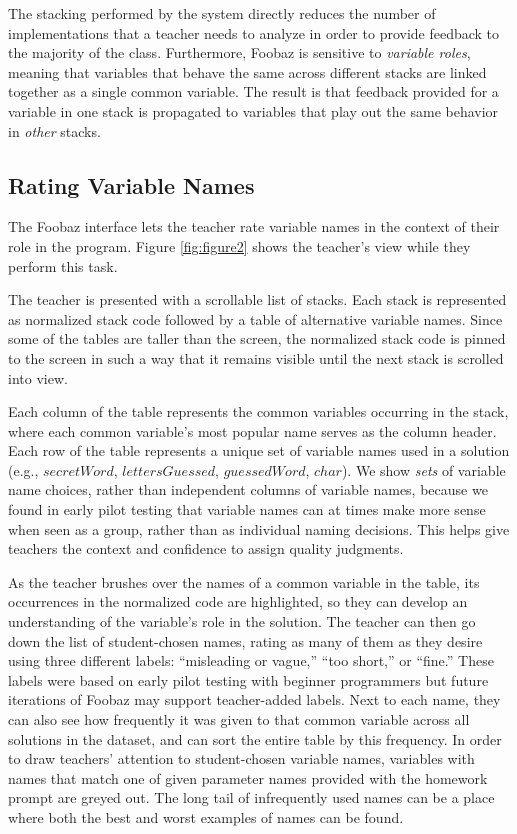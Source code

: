 The stacking performed by the system directly reduces the number of implementations that a teacher needs to analyze in order to provide feedback to the majority of the class. Furthermore, Foobaz is sensitive to \emph{variable roles}, meaning that variables that behave the same across different stacks are linked together as a single common variable. The result is that feedback provided for a variable in one stack is propagated to variables that play out the same behavior in \emph{other} stacks.

\subsection{Rating Variable Names}

The Foobaz interface lets the teacher rate variable names in the context of their role in the program. Figure \ref{fig:figure2} shows the teacher's view while they perform this task. 

The teacher is presented with a scrollable list of stacks. Each stack is represented as normalized stack code followed by a table of alternative variable names. Since some of the tables are taller than the screen, the normalized stack code is pinned to the screen in such a way that it remains visible until the next stack is scrolled into view.

Each column of the table represents the common variables occurring in the stack, where each common variable's most popular name serves as the column header. Each row of the table represents a unique set of variable names used in a solution (e.g., $secretWord$, $lettersGuessed$, $guessedWord$, $char$). We show \emph{sets} of variable name choices, rather than independent columns of variable names, because we found in early pilot testing that variable names can at times make more sense when seen as a group, rather than as individual naming decisions. This helps give teachers the context and confidence to assign quality judgments.

As the teacher brushes over the names of a common variable in the table, its occurrences in the normalized code are highlighted, so they can develop an understanding of the variable's role in the solution. The teacher can then go down the list of student-chosen names, rating as many of them as they desire using three different labels: ``misleading or vague,'' ``too short,'' or ``fine.'' These labels were based on early pilot testing with beginner programmers but future iterations of Foobaz may support teacher-added labels. Next to each name, they can also see how frequently it was given to that common variable across all solutions in the dataset, and can sort the entire table by this frequency. In order to draw teachers' attention to student-chosen variable names, variables with names that match one of given parameter names provided with the homework prompt are greyed out. The long tail of infrequently used names can be a place where both the best and worst examples of names can be found.

